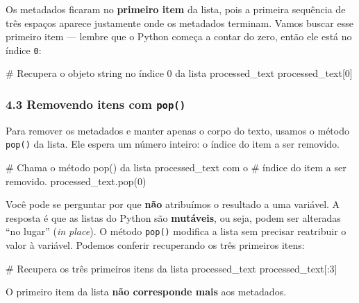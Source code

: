 \documentclass[
  brazilian,
  11pt,
]{article}
\newenvironment{Shaded}{\begin{snugshade}}{\end{snugshade}}
\newcommand{\CommentTok}[1]{\textcolor[rgb]{0.48,0.49,0.49}{#1}}
\newcommand{\DecValTok}[1]{\textcolor[rgb]{0.96,0.45,0.00}{#1}}
\newcommand{\NormalTok}[1]{\textcolor[rgb]{0.81,0.81,0.76}{#1}}
\let\oldtexttt\texttt
\renewcommand{\texttt}[1]{{\color{inlink}\oldtexttt{#1}}}
\begin{document}
Os metadados ficaram no \textbf{primeiro item} da lista, pois a primeira
sequência de três espaços aparece justamente onde os metadados terminam.
Vamos buscar esse primeiro item --- lembre que o Python começa a contar
do zero, então ele está no índice \texttt{0}:

\begin{Shaded}
\begin{Highlighting}[]
\CommentTok{\# Recupera o objeto string no índice 0 da lista \textquotesingle{}processed\_text\textquotesingle{}}
\NormalTok{processed\_text[}\DecValTok{0}\NormalTok{]}
\end{Highlighting}
\end{Shaded}

\subsubsection{\texorpdfstring{4.3 Removendo itens com
\texttt{pop()}}{4.3 Removendo itens com pop()}}\label{removendo-itens-com-pop}

Para remover os metadados e manter apenas o corpo do texto, usamos o
método \texttt{pop()} da lista. Ele espera um número inteiro: o índice
do item a ser removido.

\begin{Shaded}
\begin{Highlighting}[]
\CommentTok{\# Chama o método pop() da lista \textquotesingle{}processed\_text\textquotesingle{} com o}
\CommentTok{\# índice do item a ser removido.}
\NormalTok{processed\_text.pop(}\DecValTok{0}\NormalTok{)}
\end{Highlighting}
\end{Shaded}

Você pode se perguntar por que \textbf{não} atribuímos o resultado a uma
variável. A resposta é que as listas do Python são \textbf{mutáveis}, ou
seja, podem ser alteradas ``no lugar'' (\emph{in place}). O método
\texttt{pop()} modifica a lista sem precisar reatribuir o valor à
variável. Podemos conferir recuperando os três primeiros itens:

\begin{Shaded}
\begin{Highlighting}[]
\CommentTok{\# Recupera os três primeiros itens da lista \textquotesingle{}processed\_text\textquotesingle{}}
\NormalTok{processed\_text[:}\DecValTok{3}\NormalTok{]}
\end{Highlighting}
\end{Shaded}

O primeiro item da lista \textbf{não corresponde mais} aos metadados.
\end{document}
